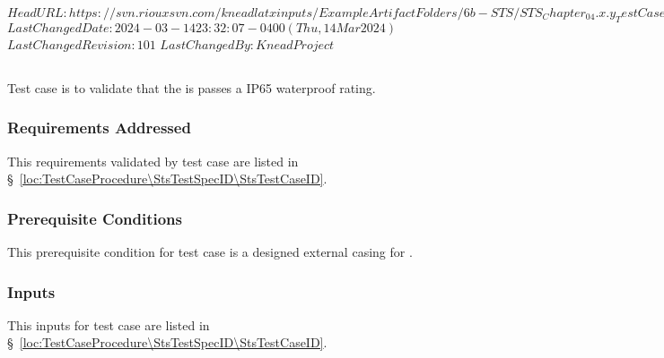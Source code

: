 \svnidlong
{$HeadURL: https://svn.riouxsvn.com/kneadlatxinputs/ExampleArtifactFolders/6b-STS/STS_Chapter_04.x.y_TestCaseBase.tex $}
{$LastChangedDate: 2024-03-14 23:32:07 -0400 (Thu, 14 Mar 2024) $}
{$LastChangedRevision: 101 $}
{$LastChangedBy: KneadProject $}

\subsection{\StsTestCaseID}
\label{loc:Test\StsTestCaseID}
% 

Test  case  is to validate that the \ThisSystem is passes a IP65 waterproof rating.

\subsubsection{Requirements Addressed}
\label{loc:TestCaseRequirementsAddressed\StsTestSpecID\StsTestCaseID}
% 

This requirements validated by test  case  are listed in \S~\ref{loc:TestCaseProcedure\StsTestSpecID\StsTestCaseID}.

\subsubsection{Prerequisite Conditions}
\label{loc:TestCasePrerequisiteConditions\StsTestSpecID\StsTestCaseID}
% 

This prerequisite condition for test  case  is a designed external casing for \ThisSystem.

\subsubsection{Inputs}
\label{loc:TestCaseInputs\StsTestSpecID\StsTestCaseID}
% 

This inputs for test  case  are listed in \S~\ref{loc:TestCaseProcedure\StsTestSpecID\StsTestCaseID}.

